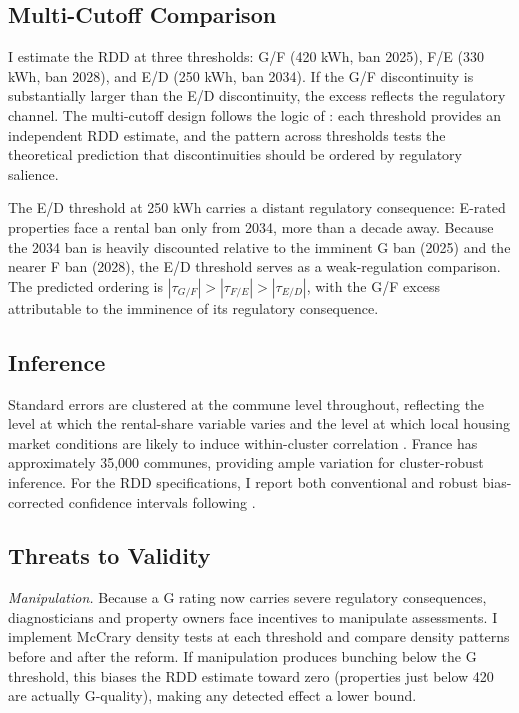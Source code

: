 \documentclass[12pt]{article}
\begin{document}
\subsection{Multi-Cutoff Comparison}

I estimate the RDD at three thresholds: G/F (420 kWh, ban 2025), F/E (330 kWh, ban 2028), and E/D (250 kWh, ban 2034). If the G/F discontinuity is substantially larger than the E/D discontinuity, the excess reflects the regulatory channel. The multi-cutoff design follows the logic of \citet{cattaneo2019practical}: each threshold provides an independent RDD estimate, and the pattern across thresholds tests the theoretical prediction that discontinuities should be ordered by regulatory salience.

The E/D threshold at 250 kWh carries a distant regulatory consequence: E-rated properties face a rental ban only from 2034, more than a decade away. Because the 2034 ban is heavily discounted relative to the imminent G ban (2025) and the nearer F ban (2028), the E/D threshold serves as a weak-regulation comparison. The predicted ordering is $|\tau_{G/F}| > |\tau_{F/E}| > |\tau_{E/D}|$, with the G/F excess attributable to the imminence of its regulatory consequence.

\subsection{Inference}

Standard errors are clustered at the commune level throughout, reflecting the level at which the rental-share variable varies and the level at which local housing market conditions are likely to induce within-cluster correlation \citep{abadie2020sampling}. France has approximately 35,000 communes, providing ample variation for cluster-robust inference. For the RDD specifications, I report both conventional and robust bias-corrected confidence intervals following \citet{calonico2014robust}.

\subsection{Threats to Validity}

\textit{Manipulation.} Because a G rating now carries severe regulatory consequences, diagnosticians and property owners face incentives to manipulate assessments. I implement McCrary density tests \citep{cattaneo2020density} at each threshold and compare density patterns before and after the reform. If manipulation produces bunching below the G threshold, this biases the RDD estimate toward zero (properties just below 420 are actually G-quality), making any detected effect a lower bound.
\end{document}
